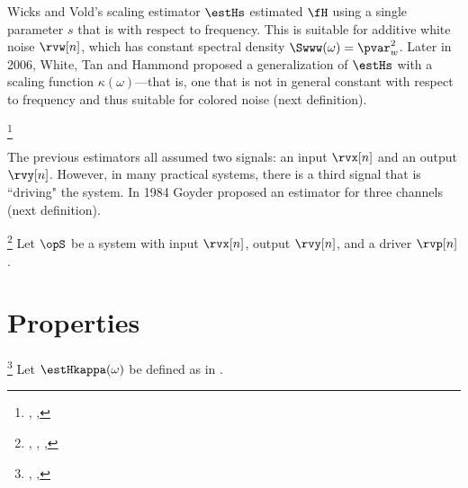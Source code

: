 Wicks and Vold's scaling estimator $\estHs$ estimated $\fH$ using a single parameter $s$
that is  with respect to frequency.
This is suitable for additive white noise $\rvw[n]$, which has constant spectral density 
$\Swww(\omega)=\pvar_w^2$.
Later in 2006, White, Tan and Hammond proposed a generalization of $\estHs$ with a scaling 
function $\kappa(\omega)$---that is, one that is not in general constant with respect to frequency
and thus suitable for colored noise (next definition).
\begin{definition}
\footnote{
  ,
  ,
  }
\label{def:Hkappa}
\end{definition}

The previous estimators all assumed two signals: an input $\rvx[n]$ and an output $\rvy[n]$.
However, in many practical systems, there is a third signal that is ``driving" the system.
In 1984 Goyder proposed an estimator for three channels (next definition).
\begin{definition}
\footnote{
  ,
  ,
  ,
  }
\label{def:Hc}
Let $\opS$ be a system with input $\rvx[n]$, output $\rvy[n]$, and a driver $\rvp[n]$.
\end{definition}



\section{Properties}
\begin{proposition}
\footnote{
  ,
  ,
  }
\label{prop:Hkappa}
Let $\estHkappa(\omega)$ be defined as in .
\end{proposition}

